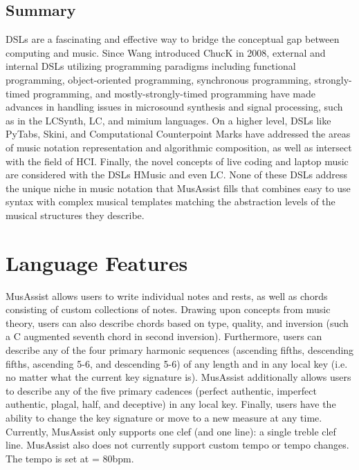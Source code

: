 \documentclass{report}
\begin{document}
 

\section{Summary}
DSLs are a fascinating and effective way to bridge the conceptual gap between computing and music. Since Wang introduced ChucK in 2008, external and internal DSLs utilizing programming paradigms including functional programming, object-oriented programming, synchronous programming, strongly-timed programming, and mostly-strongly-timed programming have made advances in handling issues in microsound synthesis and signal processing, such as in the LCSynth, LC, and mimium languages. On a higher level, DSLs like PyTabs, Skini, and Computational Counterpoint Marks have addressed the areas of music notation representation and algorithmic composition, as well as intersect with the field of HCI. Finally, the novel concepts of live coding and laptop music are considered with the DSLs HMusic and even LC. None of these DSLs address the unique niche in music notation that MusAssist fills that combines easy to use syntax with complex musical templates matching the abstraction levels of the musical structures they describe. 

\chapter{Language Features}
\label{chap:langfeatures}

MusAssist allows users to write individual notes and rests, as well as chords consisting of custom collections of notes. Drawing upon concepts from music theory, users can also describe chords based on type, quality, and inversion (such a C augmented seventh chord in second inversion). Furthermore, users can describe any of the four primary harmonic sequences (ascending fifths, descending fifths, ascending 5-6, and descending 5-6) of any length and in any local key (i.e. no matter what the current key signature is). MusAssist additionally allows users to describe any of the five primary cadences (perfect authentic, imperfect authentic, plagal, half, and deceptive) in any local key. Finally, users have the ability to change the key signature or move to a new measure at any time. Currently, MusAssist only supports one clef (and one line): a single treble clef line. MusAssist also does not currently support custom tempo or tempo changes. The tempo is set at \musQuarter\;= 80bpm.
 
\end{document}
